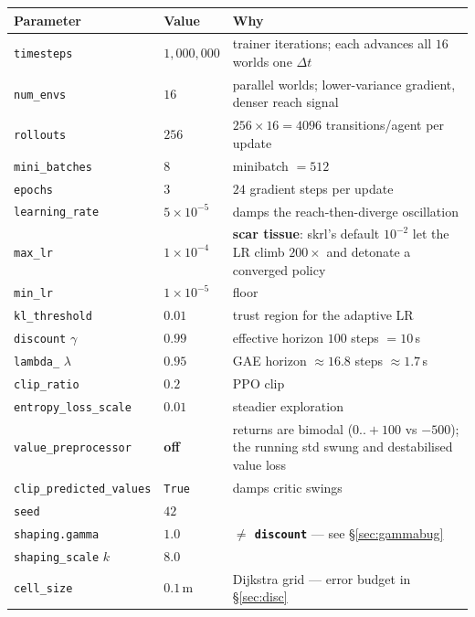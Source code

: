 \documentclass[11pt,a4paper]{article}
\newcommand{\code}[1]{\texttt{\small #1}}
\begin{document}
\begin{center}
\small
\begin{tabular}{llp{7.4cm}}
\toprule
\textbf{Parameter} & \textbf{Value} & \textbf{Why} \\
\midrule
\code{timesteps}          & $1{,}000{,}000$ & trainer iterations; each advances all $16$ worlds one $\Delta t$ \\
\code{num\_envs}          & $16$      & parallel worlds; lower-variance gradient, denser reach signal \\
\code{rollouts}           & $256$     & $256\times16 = 4096$ transitions/agent per update \\
\code{mini\_batches}      & $8$       & minibatch $=512$ \\
\code{epochs}             & $3$       & $24$ gradient steps per update \\
\code{learning\_rate}     & $5\times10^{-5}$ & damps the reach-then-diverge oscillation \\
\code{max\_lr}            & $1\times10^{-4}$ & \textbf{scar tissue}: skrl's default $10^{-2}$ let the LR climb $200\times$ and detonate a converged policy \\
\code{min\_lr}            & $1\times10^{-5}$ & floor \\
\code{kl\_threshold}      & $0.01$    & trust region for the adaptive LR \\
\code{discount} $\gamma$  & $0.99$    & effective horizon $100$ steps $=10$\,s \\
\code{lambda\_} $\lambda$ & $0.95$    & GAE horizon $\approx16.8$ steps $\approx1.7$\,s \\
\code{clip\_ratio}        & $0.2$     & PPO clip \\
\code{entropy\_loss\_scale} & $0.01$  & steadier exploration \\
\code{value\_preprocessor}  & \textbf{off} & returns are bimodal ($0..{+}100$ vs $-500$); the running std swung and destabilised value loss \\
\code{clip\_predicted\_values} & \code{True} & damps critic swings \\
\code{seed}               & $42$      & \\
\midrule
\code{shaping.gamma}      & $1.0$     & \textbf{$\ne$ \code{discount}} --- see \S\ref{sec:gammabug} \\
\code{shaping\_scale} $k$ & $8.0$     & \\
\code{cell\_size}         & $0.1$\,m  & Dijkstra grid --- error budget in \S\ref{sec:disc} \\
\bottomrule
\end{tabular}
\end{center}
\end{document}
